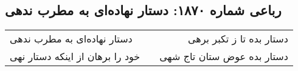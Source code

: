 \begin{center}
\section*{رباعی شماره ۱۸۷۰: دستار نهاده‌ای به مطرب ندهی}
\label{sec:1870}
\begin{longtable}{l p{0.5cm} r}
دستار نهاده‌ای به مطرب ندهی
&&
دستار بده تا ز تکبر برهی
\\
خود را برهان از اینکه دستار نهی
&&
دستار بده عوض ستان تاج شهی
\\
\end{longtable}
\end{center}
